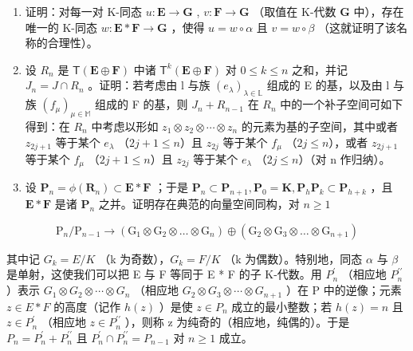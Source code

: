 \begin{enumerate}
\def\labelenumi{(\alph{enumi})}
\item
  证明：对每一对 K-同态 \(u: \mathbf{E} \to \mathbf{G}\) , \(v: \mathbf{F} \to \mathbf{G}\) （取值在 K-代数 \(\mathbf{G}\) 中），存在唯一的 K-同态 \(w: \mathbf{E} * \mathbf{F} \to \mathbf{G}\) ，使得 \(u = w \circ \alpha\) 且 \(v = w \circ \beta\) （这就证明了该名称的合理性）。
\item
  设 \(R_{n}\) 是 \(\mathsf{T}(\mathbf{E}\oplus\mathbf{F})\) 中诸 \(\mathsf{T}^{k}(\mathbf{E}\oplus\mathbf{F})\) 对 \(0\leqslant k\leqslant n\) 之和，并记 \(J_{n}=J\cap R_{n}\) 。证明：若考虑由 l 与族 \((e_{\lambda})_{\lambda\in\mathbb{L}}\) 组成的 E 的基，以及由 l 与族 \((f_{\mu})_{\mu\in\mathbb{M}}\) 组成的 F 的基，则 \(J_{n}+R_{n-1}\) 在 \(R_{n}\) 中的一个补子空间可如下得到：在 \(R_{n}\) 中考虑以形如 \(z_{1}\otimes z_{2}\otimes\cdots\otimes z_{n}\) 的元素为基的子空间，其中或者 \(z_{2j+1}\) 等于某个 \(e_{\lambda}\) （\(2j+1\leqslant n\)）且 \(z_{2j}\) 等于某个 \(f_{\mu}\) （\(2j\leqslant n\)），或者 \(z_{2j+1}\) 等于某个 \(f_{\mu}\) （\(2j+1\leqslant n\)）且 \(z_{2j}\) 等于某个 \(e_{\lambda}\) （\(2j\leqslant n\)）（对 n 作归纳）。
\item
  设 \(\mathbf{P}_n = \phi (\mathbf{R}_n)\subset \mathbf{E}*\mathbf{F}\) ；于是 \(\mathbf{P}_n\subset \mathbf{P}_{n + 1},\mathbf{P}_0 = \mathbf{K},\mathbf{P}_h\mathbf{P}_k\subset \mathbf{P}_{h + k}\) ，且 \(\mathbf{E}*\mathbf{F}\) 是诸 \(\mathbf{P}_n\) 之并。证明存在典范的向量空间同构，对 \(n\geqslant 1\)
\end{enumerate}

\[
\mathrm{P} _ {n} / \mathrm{P} _ {n - 1} \rightarrow \left(\mathrm{G} _ {1} \otimes \mathrm{G} _ {2} \otimes \dots \otimes \mathrm{G} _ {n}\right) \oplus \left(\mathrm{G} _ {2} \otimes \mathrm{G} _ {3} \otimes \dots \otimes \mathrm{G} _ {n + 1}\right)
\]

其中记 \(G_{k} = E/K\) （k 为奇数），\(G_{k} = F/K\) （k 为偶数）。特别地，同态 \(\alpha\) 与 \(\beta\) 是单射，这使我们可以把 E 与 F 等同于 E * F 的子 K-代数。用 \(P_{n}^{\prime}\) （相应地 \(P_{n}^{\prime\prime}\) ）表示 \(G_{1} \otimes G_{2} \otimes \cdots \otimes G_{n}\) （相应地 \(G_{2} \otimes G_{3} \otimes \cdots \otimes G_{n+1}\) ）在 P 中的逆像；元素 \(z \in E * F\) 的高度（记作 \(h(z)\) ）是使 \(z \in P_{n}\) 成立的最小整数；若 \(h(z) = n\) 且 \(z \in P_{n}^{\prime}\) （相应地 \(z \in P_{n}^{\prime\prime}\) ），则称 z 为纯奇的（相应地，纯偶的）。于是 \(P_{n} = P_{n}^{\prime} + P_{n}^{\prime\prime}\) 且 \(P_{n}^{\prime} \cap P_{n}^{\prime\prime} = P_{n-1}\) 对 \(n \geqslant 1\) 成立。


